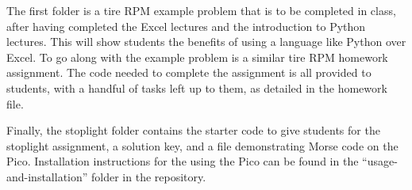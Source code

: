 The first folder is a tire RPM example problem that is to be completed in class, after having completed the Excel
lectures and the introduction to Python lectures. This will show students the benefits of using a
language like Python over Excel. To go along with the example problem is a similar tire RPM homework assignment.
The code needed to complete the assignment is all provided to students, with a handful of tasks left up to them,
as detailed in the homework file. 

Finally, the stoplight folder contains the starter code to give students for the stoplight assignment, a solution
key, and a file demonstrating Morse code on the Pico. Installation instructions for the using the Pico can be found
in the ``usage-and-installation'' folder in the repository.
